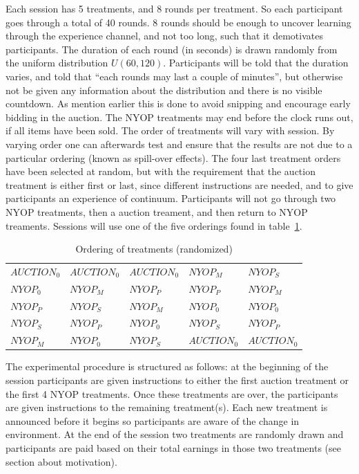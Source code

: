\documentclass[a4paper,12pt]{article}
\begin{document}
	Each session has 5 treatments, and 8 rounds per treatment. So each participant goes through a total of 40 rounds. 8 rounds should be enough to uncover learning through the experience channel, and not too long, such that it demotivates participants. The duration of each round (in seconds) is drawn randomly from the uniform distribution $U(60, 120)$. Participants will be told that the duration varies, and told that ``each rounds may last a couple of minutes'', but otherwise not be given any information about the distribution and there is no visible countdown. As mention earlier this is done to avoid snipping and encourage early bidding in the auction. The NYOP treatments may end before the clock runs out, if all items have been sold. The order of treatments will vary with session. By varying order one can afterwards test and ensure that the results are not due to a particular ordering (known as spill-over effects). The four last treatment orders have been selected at random, but with the requirement that the auction treatment is either first or last, since different instructions are needed, and to give participants an experience of continuum. Participants will not go through two NYOP treatments, then a auction treament, and then return to NYOP treaments. Sessions will use one of the five orderings found in table~\ref{tab:order}.

	\begin{table}[ht]
		\caption{Ordering of treatments (randomized)}
		\begin{tabular}{l | l | l | l | l}
			$AUCTION_0$	& $AUCTION_0$ 	& $AUCTION_0$ 	& $NYOP_M$ 		& $NYOP_S$ 	\\
			$NYOP_0$ 	& $NYOP_M$		& $NYOP_P$		& $NYOP_P$		& $NYOP_M$	\\
			$NYOP_P$ 	& $NYOP_S$		& $NYOP_M$		& $NYOP_0$		& $NYOP_0$	\\
			$NYOP_S$	& $NYOP_P$		& $NYOP_0$		& $NYOP_S$		& $NYOP_P$	\\
			$NYOP_M$	& $NYOP_0$		& $NYOP_S$		& $AUCTION_0$	& $AUCTION_0$	
		\end{tabular}
		\label{tab:order}
	\end{table}
	
	The experimental procedure is structured as follows: at the beginning of the session participants are given instructions to either the first auction treatment or the first 4 NYOP treatments. Once these treatments are over, the participants are given instructions to the remaining treatment(s). Each new treatment is announced before it begins so participants are aware of the change in environment. At the end of the session two treatments are randomly drawn and participants are paid based on their total earnings in those two treatments (see section about motivation).
\end{document}
